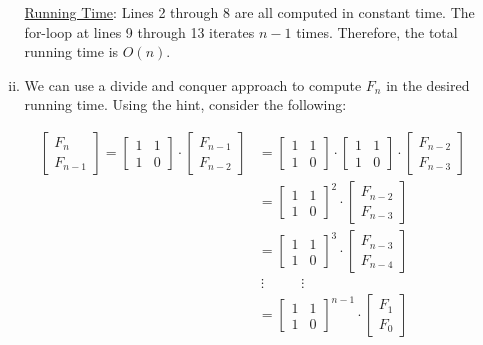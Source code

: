 \documentclass[twoside,11pt]{homework}
\begin{document}
\begin{enumerate}[\bf (a)]
\begin{enumerate}[i.)]
\noindent
\underline{Running Time}: Lines 2 through 8 are all computed in constant time. The for-loop at lines 9 through 13 iterates $n-1$ times. Therefore, the total running time is $O(n)$.  \\

\item  We can use a divide and conquer approach to compute $F_ n$ in the desired running time.  Using the hint, consider the following:

\begin{align*}
\begin{bmatrix}  F_{n}   \\  F_{n-1} \end{bmatrix} =  \begin{bmatrix}  1 & 1  \\  1 & 0  \end{bmatrix} \cdot \begin{bmatrix}  F_{n-1}   \\  F_{n-2} \end{bmatrix} & = \begin{bmatrix}  1 & 1  \\  1 & 0  \end{bmatrix} \cdot \begin{bmatrix}  1 & 1  \\  1 & 0  \end{bmatrix} \cdot \begin{bmatrix}  F_{n-2}  \\  F_{n-3} \end{bmatrix} \\[0.6em]
& = \begin{bmatrix}  1 & 1  \\  1 & 0  \end{bmatrix}^2 \cdot \begin{bmatrix}  F_{n-2}  \\  F_{n-3} \end{bmatrix}  \\[0.6em]
& = \begin{bmatrix}  1 & 1  \\  1 & 0  \end{bmatrix}^3 \cdot \begin{bmatrix}  F_{n-3}  \\  F_{n-4} \end{bmatrix}  \\
& \ \vdots \ \ \ \ \ \ \ \ \ \ \ \ \vdots \\
& = \begin{bmatrix}  1 & 1  \\  1 & 0  \end{bmatrix}^{n-1} \cdot \begin{bmatrix}  F_{1}  \\  F_{0} \end{bmatrix}
\end{align*}


\end{enumerate}
\end{enumerate}
\end{document}
